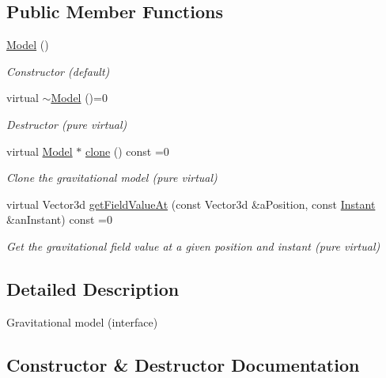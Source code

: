 \subsection*{Public Member Functions}
\begin{DoxyCompactItemize}
\item 
\hyperlink{classostk_1_1physics_1_1environment_1_1gravitational_1_1_model_ad588a72265bacd216b6d3b19d4736ae9}{Model} ()
\begin{DoxyCompactList}\small\item\em Constructor (default) \end{DoxyCompactList}\item 
virtual \hyperlink{classostk_1_1physics_1_1environment_1_1gravitational_1_1_model_ab44f53d6e046fb5d436b90128aff0850}{$\sim$\+Model} ()=0
\begin{DoxyCompactList}\small\item\em Destructor (pure virtual) \end{DoxyCompactList}\item 
virtual \hyperlink{classostk_1_1physics_1_1environment_1_1gravitational_1_1_model}{Model} $\ast$ \hyperlink{classostk_1_1physics_1_1environment_1_1gravitational_1_1_model_a399257ac86e7f0112a702141e0e2e4a7}{clone} () const =0
\begin{DoxyCompactList}\small\item\em Clone the gravitational model (pure virtual) \end{DoxyCompactList}\item 
virtual Vector3d \hyperlink{classostk_1_1physics_1_1environment_1_1gravitational_1_1_model_a5ef3b4ddf4240e8a26553294fe392581}{get\+Field\+Value\+At} (const Vector3d \&a\+Position, const \hyperlink{classostk_1_1physics_1_1time_1_1_instant}{Instant} \&an\+Instant) const =0
\begin{DoxyCompactList}\small\item\em Get the gravitational field value at a given position and instant (pure virtual) \end{DoxyCompactList}\end{DoxyCompactItemize}


\subsection{Detailed Description}
Gravitational model (interface) 

\subsection{Constructor \& Destructor Documentation}
\mbox{\label{classostk_1_1physics_1_1environment_1_1gravitational_1_1_model_ad588a72265bacd216b6d3b19d4736ae9}} 
